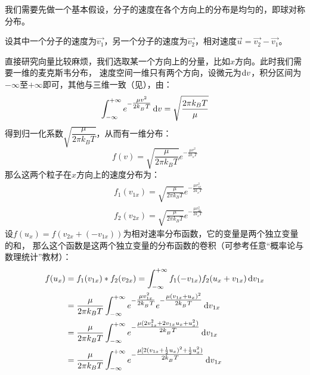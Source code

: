 		\begin{prove}
			我们需要先做一个基本假设，分子的速度在各个方向上的分布是均匀的，即球对称分布。
			
			设其中一个分子的速度为$\vec{v_1}$，另一个分子的速度为$\vec{v_2}$，相对速度$\vec{u} = \vec{v_2} - \vec{v_1}$。
			
			直接研究向量比较麻烦，我们选取某一个方向上的分量，比如$x$方向。此时我们需要一维的麦克斯韦分布，
			速度空间一维只有两个方向，设微元为$\dif v$，积分区间为$-\infty$至$+\infty$即可，其他与三维一致（见），由：
			\begin{equation}
				\int_{-\infty}^{+\infty} e^{-\tfrac{\mu v^{2}}{2k_{_B}T}}\dif{v} = \sqrt{\frac{2\pi k_{B}T}{\mu}}
			\end{equation}
			得到归一化系数$\sqrt{\dfrac{\mu}{2\pi k_{B}T}}$，从而有一维分布：
			\begin{equation*}
				f(v) = \sqrt{\frac{\mu}{2\pi k_{B}T}}e^{-\tfrac{\mu v^{2}}{2k_{_B}T}}
			\end{equation*}
			那么这两个粒子在$x$方向上的速度分布为：
			\begin{equation*}
				\begin{aligned}
					&f_1(v_{1x}) = \sqrt{\frac{\mu}{2\pi k_{B}T}}e^{-\tfrac{\mu v_{1x}^{2}}{2k_{_B}T}}\\
					&f_2(v_{2x}) = \sqrt{\frac{\mu}{2\pi k_{B}T}}e^{-\tfrac{\mu v_{2x}^{2}}{2k_{_B}T}}
				\end{aligned}
			\end{equation*}
			设$f(u_x) = f(v_{2x} + (- v_{1x}))$为相对速率分布函数，它的变量是两个独立变量的和，
			那么这个函数是这两个独立变量的分布函数的卷积（可参考任意“概率论与数理统计”教材）：
			\begin{equation*}
				\begin{aligned}
					f(u_x) &= f_1(v_{1x}) \ast f_2(v_{2x}) = \int_{-\infty}^{+\infty} f_1(- v_{1x})f_2(u_x + v_{1x})\dif v_{1x}\\
					&=\frac{\mu}{2\pi k_{B}T} \int_{-\infty}^{+\infty} e^{-\tfrac{\mu v_{1x}^{2}}{2k_{_B}T}} e^{-\tfrac{\mu (v_{1x} + u_x)^{2}}{2k_{_B}T}} \dif v_{1x}\\
					&=\frac{\mu}{2\pi k_{B}T} \int_{-\infty}^{+\infty} e^{-\tfrac{\mu (2v_{1x}^{2}+ 2v_{1x}u_{x} + u_{x}^{2})}{2k_{_B}T}} \dif v_{1x}\\
					&=\frac{\mu}{2\pi k_{B}T} \int_{-\infty}^{+\infty} e^{-\tfrac{\mu [2(v_{1x} + \frac{1}{2}u_{x})^{2}+ \frac{1}{2} u_{x}^{2})}{2k_{_B}T}} \dif v_{1x}\\

\end{aligned}
\end{equation*}
\end{prove}
